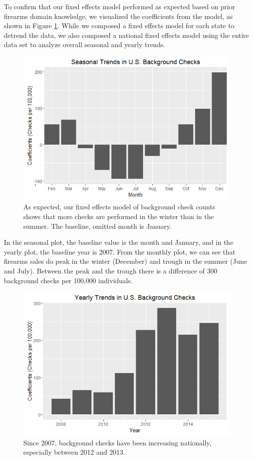 \documentclass[9pt,twocolumn,twoside,lineno]{pnas-new}
\begin{document}
To confirm that our fixed effects model performed as expected based on prior firearms domain knowledge, we visualized the coefficients from the model, as shown in Figure \ref{fig:seasonal}. While we composed a fixed effects model for each state to detrend the data, we also composed a national fixed effects model using the entire data set to analyze overall seasonal and yearly trends. 
\begin{figure}%
  \centering
  \includegraphics[width=\linewidth]{figures/seasonal}
  \caption{As expected, our fixed effects model of background check counts shows that more checks are performed in the winter than in the summer. The baseline, omitted month is January.}
  \label{fig:seasonal}
\end{figure}
	In the seasonal plot, the baseline value is the month and January, and in the yearly plot, the baseline year is 2007. From the monthly plot, we can see that firearms sales do peak in the winter (December) and trough in the summer (June and July). Between the peak and the trough there is a difference of 300 background checks per 100,000 individuals.
\begin{figure}%
  \centering
  \includegraphics[width=\linewidth]{figures/yearly}
  \caption{Since 2007, background checks have been increasing nationally, especially between 2012 and 2013.}
  \label{fig:yearly}
\end{figure}  
\end{document}
